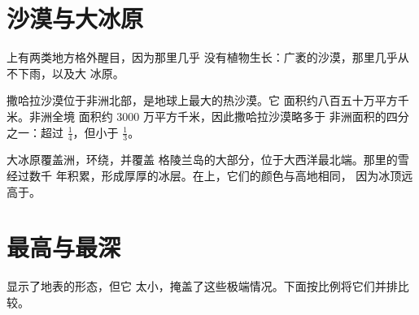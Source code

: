 \section{沙漠与大冰原}

上有两类地方格外醒目，因为那里几乎
没有植物生长：广袤的沙漠，那里几乎从不下雨，以及大
冰原。

撒哈拉沙漠位于非洲北部，是地球上最大的热沙漠。它
面积约八百五十万平方千米。非洲全境
面积约 3000 万平方千米，因此撒哈拉沙漠略多于
非洲面积的四分之一：超过 $\frac{1}{4}$，但小于
$\frac{1}{3}$。

大冰原覆盖洲，环绕，并覆盖
格陵兰岛的大部分，位于大西洋最北端。那里的雪经过数千
年积累，形成厚厚的冰层。在上，它们的颜色与高地相同，
因为冰顶远高于。

\section{最高与最深}

显示了地表的形态，但它
太小，掩盖了这些极端情况。下面按比例将它们并排比较。

